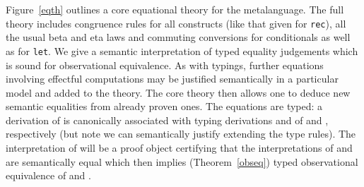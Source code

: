 \documentclass[orivec]{llncs}
\newif\iffull\fullfalse
\renewcommand{\paragraph}[1]{\noindent {\bf #1}}
\newcommand{\squelch}[1]{}
\begin{document}
\paragraph{Equations} Figure~\ref{eqth} outlines a core equational theory for
the metalanguage.  The full theory includes congruence rules for all
constructs (like that given for \texttt{rec}), all the usual beta and
eta laws and commuting conversions for conditionals as well as for
\texttt{let}.
We give
a semantic interpretation of typed equality judgements which is sound
for observational equivalence. 
As with typings, further equations involving effectful computations may be
justified semantically in a particular model and added to the theory.
The core theory then allows one to
deduce new semantic equalities from already proven ones. 
The equations are typed: a derivation
 of  is canonically
associated with typing derivations  and 
of  and ,
respectively (but note we can semantically justify extending the
type rules). The interpretation of
 will be a proof object certifying that the 
interpretations of  and  are
semantically equal which then implies (Theorem~\ref{obseq}) typed
observational equivalence of  and .

\squelch{
\begin{figure*}[tph]
\iffull

\else
\vspace{-7mm}


\fi
\caption{Semantics of the untyped meta language \label{seme}}
\vspace{-8mm}
\end{figure*}
}

\begin{figure*}[tph]
\vspace{-3mm}



\caption{Core rules for effect typing\label{tyres}\label{efte}}
\vspace{-5mm}
\end{figure*}
\begin{figure*}[tph]
\vspace{-3mm}

\iffull \vspace{2pt} \fi

\iffull \vspace{2pt} \fi

\iffull \vspace{2pt} \fi

\caption{Basic equational theory (extract)\label{eqth}}
\iffull
\else
\vspace{-2mm}
\fi
\end{figure*}
\end{document}
